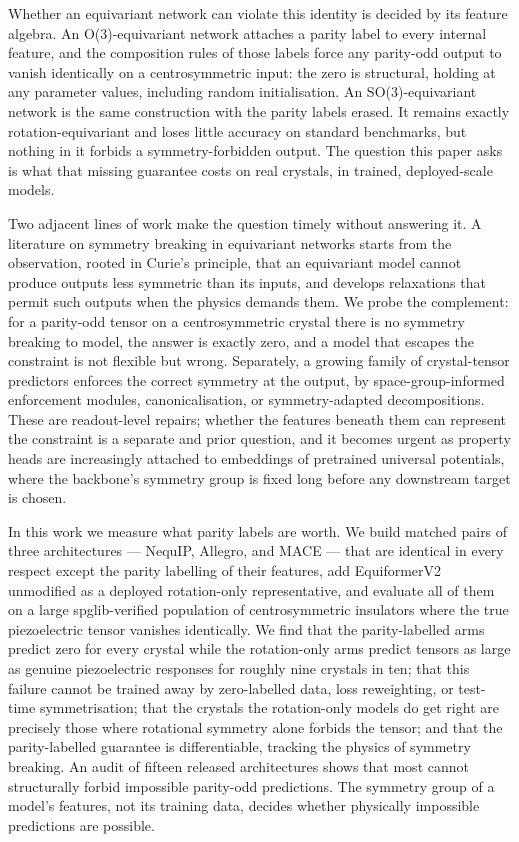 Whether an equivariant network can violate this identity is decided by its feature algebra. An O(3)-equivariant network attaches a parity label to every internal feature, and the composition rules of those labels force any parity-odd output to vanish identically on a centrosymmetric input: the zero is structural, holding at any parameter values, including random initialisation. An SO(3)-equivariant network is the same construction with the parity labels erased. It remains exactly rotation-equivariant and loses little accuracy on standard benchmarks, but nothing in it forbids a symmetry-forbidden output. The question this paper asks is what that missing guarantee costs on real crystals, in trained, deployed-scale models.

Two adjacent lines of work make the question timely without answering it. A literature on symmetry breaking in equivariant networks starts from the observation, rooted in Curie's principle\cite{curie1894symmetry}, that an equivariant model cannot produce outputs less symmetric than its inputs, and develops relaxations that permit such outputs when the physics demands them\cite{smidt2021symmetry,xie2024symmetrybreaking,kaba2023symmetry,prob2025symmetry}. We probe the complement: for a parity-odd tensor on a centrosymmetric crystal there is no symmetry breaking to model, the answer is exactly zero, and a model that escapes the constraint is not flexible but wrong. Separately, a growing family of crystal-tensor predictors enforces the correct symmetry at the output, by space-group-informed enforcement modules, canonicalisation, or symmetry-adapted decompositions\cite{yan2024gmtnet,goectp2024,lu2025eatgnn,piezotensornet2024,ceitnet2026}. These are readout-level repairs; whether the features beneath them can represent the constraint is a separate and prior question, and it becomes urgent as property heads are increasingly attached to embeddings of pretrained universal potentials\cite{hung2024dielectric}, where the backbone's symmetry group is fixed long before any downstream target is chosen.

In this work we measure what parity labels are worth. We build matched pairs of three architectures --- NequIP, Allegro, and MACE --- that are identical in every respect except the parity labelling of their features, add EquiformerV2 unmodified as a deployed rotation-only representative, and evaluate all of them on a large spglib-verified population of centrosymmetric insulators where the true piezoelectric tensor vanishes identically. We find that the parity-labelled arms predict zero for every crystal while the rotation-only arms predict tensors as large as genuine piezoelectric responses for roughly nine crystals in ten; that this failure cannot be trained away by zero-labelled data, loss reweighting, or test-time symmetrisation; that the crystals the rotation-only models do get right are precisely those where rotational symmetry alone forbids the tensor; and that the parity-labelled guarantee is differentiable, tracking the physics of symmetry breaking. An audit of fifteen released architectures shows that most cannot structurally forbid impossible parity-odd predictions. The symmetry group of a model's features, not its training data, decides whether physically impossible predictions are possible.
